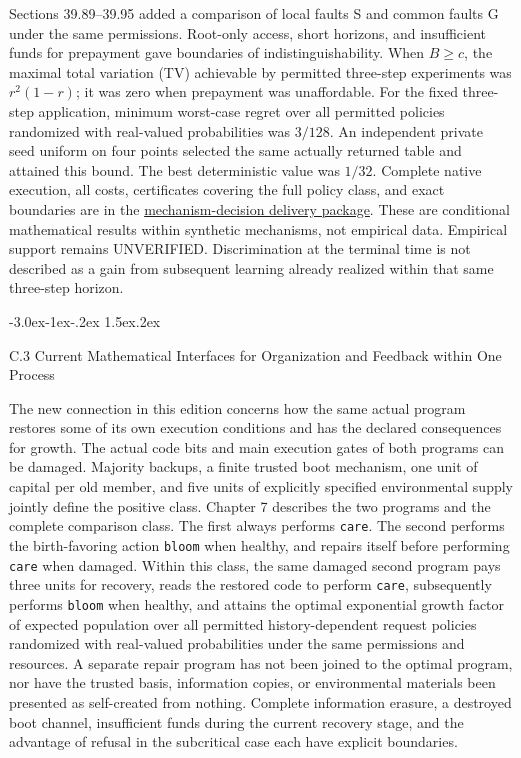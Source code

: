 \documentclass[
  english,
  11pt,
  oneside]{book}
\makeatletter
\renewcommand\section{\@startsection{section}{1}{\z@}%
  {-3.0ex\@plus-1ex\@minus-.2ex}%
  {1.5ex\@plus.2ex}%
  {\normalfont\Large\bfseries\raggedright\hyphenpenalty=10000\exhyphenpenalty=10000}}
\makeatother
\begin{document}
Sections 39.89--39.95 added a comparison of local faults S and common faults G under the same permissions. Root-only access, short horizons, and insufficient funds for prepayment gave boundaries of indistinguishability. When \(B\ge c\), the maximal total variation (TV) achievable by permitted three-step experiments was \(r^2(1-r)\); it was zero when prepayment was unaffordable. For the fixed three-step application, minimum worst-case regret over all permitted policies randomized with real-valued probabilities was \(3/128\). An independent private seed uniform on four points selected the same actually returned table and attained this bound. The best deterministic value was \(1/32\). Complete native execution, all costs, certificates covering the full policy class, and exact boundaries are in the \href{https://github.com/MurphyHoops/UEOT/blob/3d443ec29eb17af1fc00699a74e2d42d73516d81/formalization/ueot-core/docs/compression/theory_completion/unified_closure/mechanism_decision_closure_v1/README.md}{mechanism-decision delivery package}. These are conditional mathematical results within synthetic mechanisms, not empirical data. Empirical support remains UNVERIFIED. Discrimination at the terminal time is not described as a gain from subsequent learning already realized within that same three-step horizon.

\section{C.3 Current Mathematical Interfaces for Organization and Feedback within One Process}\label{ph-c-3}

The new connection in this edition concerns how the same actual program restores some of its own execution conditions and has the declared consequences for growth. The actual code bits and main execution gates of both programs can be damaged. Majority backups, a finite trusted boot mechanism, one unit of capital per old member, and five units of explicitly specified environmental supply jointly define the positive class. Chapter 7 describes the two programs and the complete comparison class. The first always performs \texttt{care}. The second performs the birth-favoring action \texttt{bloom} when healthy, and repairs itself before performing \texttt{care} when damaged. Within this class, the same damaged second program pays three units for recovery, reads the restored code to perform \texttt{care}, subsequently performs \texttt{bloom} when healthy, and attains the optimal exponential growth factor of expected population over all permitted history-dependent request policies randomized with real-valued probabilities under the same permissions and resources. A separate repair program has not been joined to the optimal program, nor have the trusted basis, information copies, or environmental materials been presented as self-created from nothing. Complete information erasure, a destroyed boot channel, insufficient funds during the current recovery stage, and the advantage of refusal in the subcritical case each have explicit boundaries.
\end{document}
